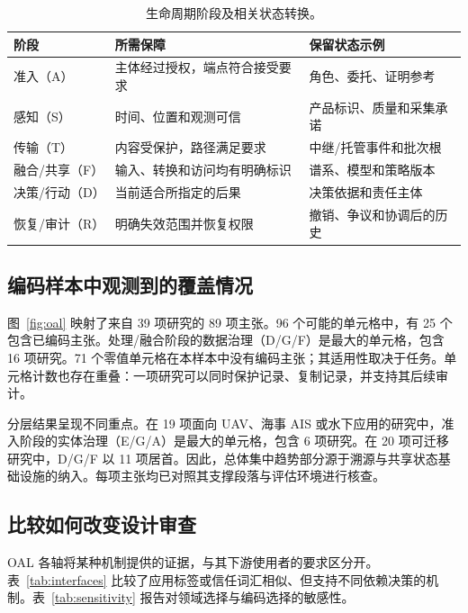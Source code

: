 \begin{table}[H]\small
\caption{生命周期阶段及相关状态转换。}\label{tab:lifecycle}
\begin{tabularx}{\textwidth}{@{}P{30mm}YY@{}}\toprule
\textbf{阶段} & \textbf{所需保障} & \textbf{保留状态示例}\\\midrule
准入（A） & 主体经过授权，端点符合接受要求 & 角色、委托、证明参考\\
感知（S） & 时间、位置和观测可信 & 产品标识、质量和采集承诺\\
传输（T） & 内容受保护，路径满足要求 & 中继/托管事件和批次根\\
融合/共享（F） & 输入、转换和访问均有明确标识 & 谱系、模型和策略版本\\
决策/行动（D） & 当前适合所指定的后果 & 决策依据和责任主体\\
恢复/审计（R） & 明确失效范围并恢复权限 & 撤销、争议和协调后的历史\\\bottomrule
\end{tabularx}\end{table}

\subsection{编码样本中观测到的覆盖情况}\label{sec:coverage}

图~\ref{fig:oal} 映射了来自 39 项研究的 89 项主张。96 个可能的单元格中，有 25 个包含已编码主张。处理/融合阶段的数据治理（D/G/F）是最大的单元格，包含 16 项研究。71 个零值单元格在本样本中没有编码主张；其适用性取决于任务。单元格计数也存在重叠：一项研究可以同时保护记录、复制记录，并支持其后续审计。

分层结果呈现不同重点。在 19 项面向 UAV、海事 AIS 或水下应用的研究中，准入阶段的实体治理（E/G/A）是最大的单元格，包含 6 项研究。在 20 项可迁移研究中，D/G/F 以 11 项居首。因此，总体集中趋势部分源于溯源与共享状态基础设施的纳入。每项主张均已对照其支撑段落与评估环境进行核查。

\subsection{比较如何改变设计审查}\label{sec:comparative}

OAL 各轴将某种机制提供的证据，与其下游使用者的要求区分开。表~\ref{tab:interfaces} 比较了应用标签或信任词汇相似、但支持不同依赖决策的机制。表~\ref{tab:sensitivity} 报告对领域选择与编码选择的敏感性。

